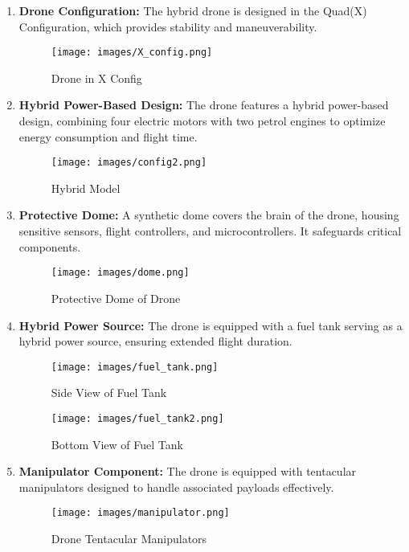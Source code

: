 \documentclass[preprint,12pt]{elsarticle}
\begin{document}
\begin{enumerate}
    \item \textbf{Drone Configuration:} The hybrid drone is designed in the Quad(X) Configuration, which provides stability and maneuverability.

    \begin{figure}[!htbp]
    \centering
    \texttt{[image: images/X\_config.png]}
    \caption{Drone in X Config}
    \end{figure}

    \item \textbf{Hybrid Power-Based Design:} The drone features a hybrid power-based design, combining four electric motors with two petrol engines to optimize energy consumption and flight time.\\

    \begin{figure}[!htbp]
    \centering
    \vspace{-0.5cm}
    \texttt{[image: images/config2.png]}
    \caption{Hybrid Model}
    \end{figure}

    \item \textbf{Protective Dome:} A synthetic dome covers the brain of the drone, housing sensitive sensors, flight controllers, and microcontrollers. It safeguards critical components.\\

    \begin{figure}[!htbp]
    \centering
    \vspace{-0.5cm}
    \texttt{[image: images/dome.png]}
    \caption{Protective Dome of Drone}
    \end{figure}

    \item \textbf{Hybrid Power Source:} The drone is equipped with a fuel tank serving as a hybrid power source, ensuring extended flight duration.\\

    \begin{figure}[!htbp]
    \centering
    \texttt{[image: images/fuel\_tank.png]}
    \caption{Side View of Fuel Tank}
    \end{figure}
    
    \begin{figure}[!htbp]
    \centering
    \texttt{[image: images/fuel\_tank2.png]}
    \caption{Bottom View of Fuel Tank}
    \end{figure}

    \item \textbf{Manipulator Component:} The drone is equipped with tentacular manipulators designed to handle associated payloads effectively.\\

    \begin{figure}[!htbp]
    \centering

    \texttt{[image: images/manipulator.png]}
    \caption{Drone Tentacular Manipulators}
    \end{figure}
\end{enumerate}
\end{document}
